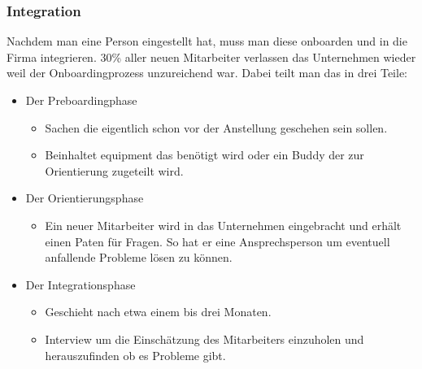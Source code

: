 \documentclass{article}
\begin{document}
	 \subsubsection{Integration}
	 Nachdem man eine Person eingestellt hat, muss man diese onboarden und in die Firma integrieren. 30\% aller neuen Mitarbeiter verlassen das Unternehmen wieder weil der Onboardingprozess unzureichend war. Dabei teilt man das in drei Teile:
	 \begin{itemize}
	 	\item{Der Preboardingphase}
	 	\begin{itemize}
	 		\item{Sachen die eigentlich schon vor der Anstellung geschehen sein sollen.}
	 		\item{Beinhaltet equipment das benötigt wird oder ein Buddy der zur Orientierung zugeteilt wird.}
	 	\end{itemize}
	 	\item{Der Orientierungsphase}
	 	\begin{itemize}
	 		\item{Ein neuer Mitarbeiter wird in das Unternehmen eingebracht und erhält einen Paten für Fragen. So hat er eine Ansprechsperson um eventuell anfallende Probleme lösen zu können.}
	 	\end{itemize}
	 	\item{Der Integrationsphase}
	 	\begin{itemize}
	 		\item{Geschieht nach etwa einem bis drei Monaten.}
	 		\item{Interview um die Einschätzung des Mitarbeiters einzuholen und herauszufinden ob es Probleme gibt.}
	 	\end{itemize}
	 \end{itemize}
\end{document}
